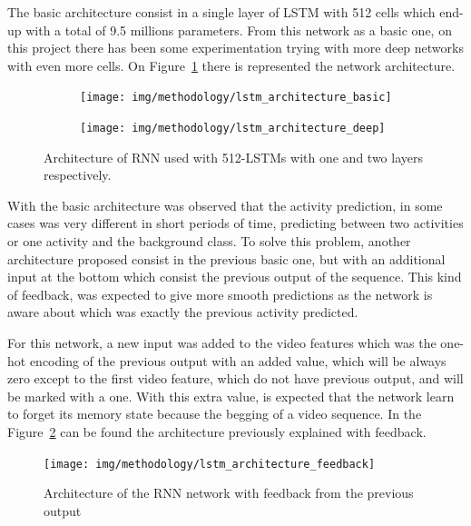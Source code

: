 The basic architecture consist in a single layer of LSTM with 512 cells which end-up with a total of 9.5 millions parameters. From this network as a basic one, on this project there has been some experimentation trying with more deep networks with even more cells. On Figure~\ref{fig:lstm_architecture} there is represented the network architecture.

\begin{figure}[H]
\centering
\begin{subfigure}[b]{.5\textwidth}
  \centering
  \texttt{[image: img/methodology/lstm\_architecture\_basic]}
\end{subfigure}%
\begin{subfigure}[b]{.5\textwidth}
  \centering
  \texttt{[image: img/methodology/lstm\_architecture\_deep]}
\end{subfigure}
\caption{Architecture of RNN used with 512-LSTMs with one and two layers respectively.}
\label{fig:lstm_architecture}
\end{figure}

With the basic architecture was observed that the activity prediction, in some cases was very different in short periods of time, predicting between two activities or one activity and the background class. To solve this problem, another architecture proposed consist in the previous basic one, but with an additional input at the bottom which consist the previous output of the sequence. This kind of feedback, was expected to give more smooth predictions as the network is aware about which was exactly the previous activity predicted.

For this network, a new input was added to the video features which was the one-hot encoding of the previous output with an added value, which will be always zero except to the first video feature, which do not have previous output, and will be marked with a one. With this extra value, is expected that the network learn to forget its memory state because the begging of a video sequence. In the Figure~\ref{fig:lstm_architecture_feedback} can be found the architecture previously explained with feedback.

\begin{figure}[H]
\begin{center}
\texttt{[image: img/methodology/lstm\_architecture\_feedback]}
\end{center}
\caption{Architecture of the RNN network with feedback from the previous output}
\label{fig:lstm_architecture_feedback}
\end{figure}



